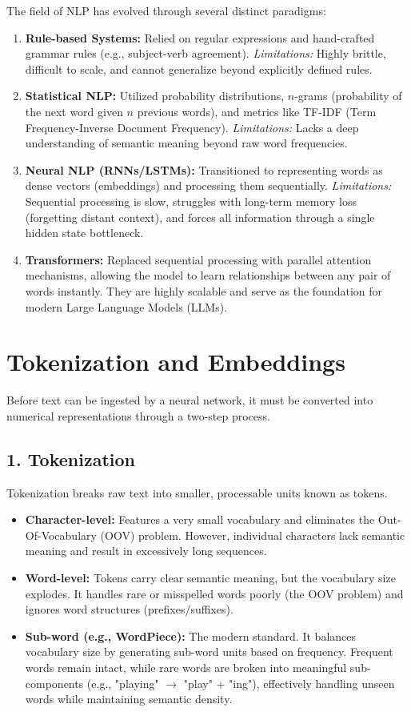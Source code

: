 The field of NLP has evolved through several distinct paradigms:
\begin{enumerate}
    \item \textbf{Rule-based Systems:} Relied on regular expressions and hand-crafted grammar rules (e.g., subject-verb agreement). \textit{Limitations:} Highly brittle, difficult to scale, and cannot generalize beyond explicitly defined rules.
    \item \textbf{Statistical NLP:} Utilized probability distributions, $n$-grams (probability of the next word given $n$ previous words), and metrics like TF-IDF (Term Frequency-Inverse Document Frequency). \textit{Limitations:} Lacks a deep understanding of semantic meaning beyond raw word frequencies.
    \item \textbf{Neural NLP (RNNs/LSTMs):} Transitioned to representing words as dense vectors (embeddings) and processing them sequentially. \textit{Limitations:} Sequential processing is slow, struggles with long-term memory loss (forgetting distant context), and forces all information through a single hidden state bottleneck.
    \item \textbf{Transformers:} Replaced sequential processing with parallel attention mechanisms, allowing the model to learn relationships between any pair of words instantly. They are highly scalable and serve as the foundation for modern Large Language Models (LLMs).
\end{enumerate}

\section*{Tokenization and Embeddings}

Before text can be ingested by a neural network, it must be converted into numerical representations through a two-step process.

\subsection*{1. Tokenization}
Tokenization breaks raw text into smaller, processable units known as tokens.
\begin{itemize}
    \item \textbf{Character-level:} Features a very small vocabulary and eliminates the Out-Of-Vocabulary (OOV) problem. However, individual characters lack semantic meaning and result in excessively long sequences.
    \item \textbf{Word-level:} Tokens carry clear semantic meaning, but the vocabulary size explodes. It handles rare or misspelled words poorly (the OOV problem) and ignores word structures (prefixes/suffixes).
    \item \textbf{Sub-word (e.g., WordPiece):} The modern standard. It balances vocabulary size by generating sub-word units based on frequency. Frequent words remain intact, while rare words are broken into meaningful sub-components (e.g., "playing" $\to$ "play" + "ing"), effectively handling unseen words while maintaining semantic density.
\end{itemize}

